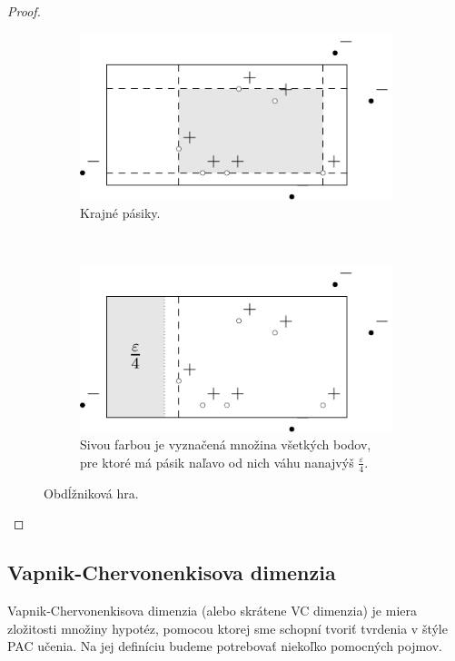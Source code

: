 \begin{proof}
  \begin{figure}
    \begin{subfigure}[t]{0.49\linewidth}
      \centering
      \includegraphics[scale=1]{obrazky/rectgame2.pdf}
      \caption{Krajné pásiky.}
      \label{rectgame:strips}
    \end{subfigure}
    ~
    \begin{subfigure}[t]{0.49\linewidth}
      \centering
      \includegraphics[scale=1]{obrazky/rectgame3.pdf}
      \caption{Sivou farbou je vyznačená množina všetkých
        bodov, pre ktoré má pásik naľavo od nich váhu nanajvýš
        $\frac{\varepsilon}{4}$.}
      \label{rectgame:eps_strip}
    \end{subfigure}
    \caption{Obdĺžniková hra.}
  \end{figure}
  
\end{proof}




\subsection{Vapnik-Chervonenkisova dimenzia}

Vapnik-Chervonenkisova dimenzia (alebo skrátene VC dimenzia) je miera
zložitosti množiny hypotéz, pomocou ktorej sme schopní tvoriť tvrdenia
v štýle PAC učenia. Na jej definíciu budeme potrebovať niekoľko pomocných
pojmov.

